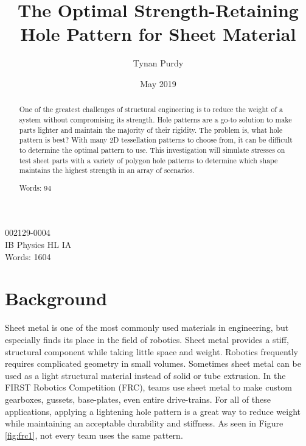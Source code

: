 \documentclass[12pt, letterpaper]{article}
\title{The Optimal Strength-Retaining Hole Pattern for Sheet Material}
\author{Tynan Purdy}
\date{May 2019}
\begin{document}
\nocite{*}
\large
\doublespace{}
\parindent=0.5in

{\fontsize{12}{14.4}
  {\singlespace
    \maketitle
    \begin{center}
    002129-0004 \\
    \vspace{4mm}
    IB Physics HL IA \\
    \vspace{4mm}
    Words: 1604  \\ %
    \end{center}
  }
}	

\newpage
{}

\begin{abstract}
One of the greatest challenges of structural engineering is to reduce the weight of a system without compromising its strength. Hole patterns are a go-to solution to make parts lighter and maintain the majority of their rigidity. The problem is, what hole pattern is best? With many 2D tessellation patterns to choose from, it can be difficult to determine the optimal pattern to use. This investigation will simulate stresses on test sheet parts with a variety of polygon hole patterns to determine which shape maintains the highest strength in an array of scenarios. 

Words: 94 %

\end{abstract}

\newpage
\tableofcontents
\newpage

\section{Background}
\label{sec:background}

Sheet metal is one of the most commonly used materials in engineering, but especially finds its place in the field of robotics. Sheet metal provides a stiff, structural component while taking little space and weight. Robotics frequently requires complicated geometry in small volumes. Sometimes sheet metal can be used as a light structural material instead of solid or tube extrusion. In the FIRST Robotics Competition (FRC), teams use sheet metal to make custom gearboxes, gussets, base-plates, even entire drive-trains. For all of these applications, applying a lightening hole pattern is a great way to reduce weight while maintaining an acceptable durability and stiffness. As seen in Figure \ref{fig:frc1}, not every team uses the same pattern.
\end{document}
